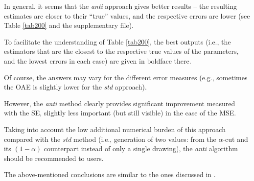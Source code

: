 In general, it seems that the \emph{anti} approach gives better results -- the resulting estimates are closer to their ``true'' values, and the respective errors are lower (see Table \ref{tab200} and the supplementary file).

To facilitate the understanding of Table \ref{tab200}, the best outputs (i.e., the estimators that are the closest to the respective true values of the parameters, and the lowest errors in each case) are given in boldface there.

Of course, the answers may vary for the different error measures (e.g., sometimes the OAE is slightly lower for the \emph{std} approach).

However, the \emph{anti} method clearly provides significant improvement measured with the SE, slightly less important (but still visible) in the case of the MSE.

Taking into account the low additional numerical burden of this approach compared with the \emph{std} method (i.e., generation of two values: from the $\alpha$-cut and its $(1-\alpha)$ counterpart instead of only a single drawing), the \emph{anti} algorithm should be recommended to users.

The above-mentioned conclusions are similar to the ones discussed in \cite{grzegorzewski2021,pgmr2022}.

